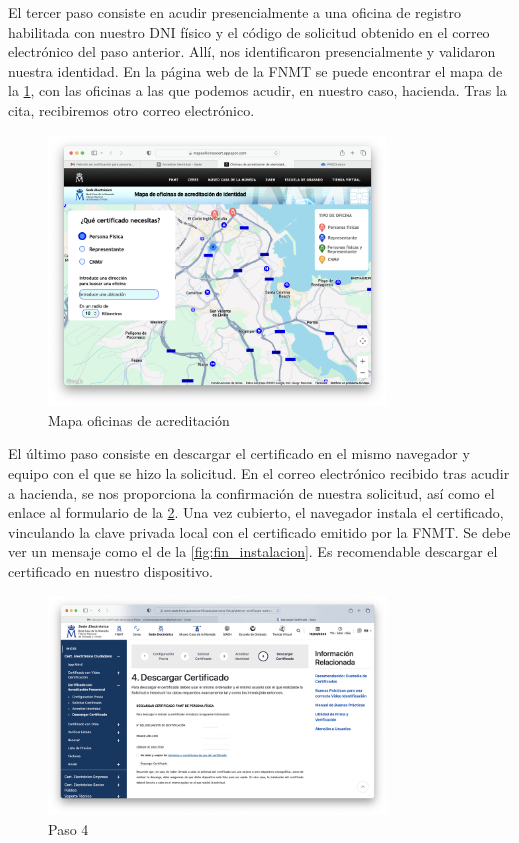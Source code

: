 El tercer paso consiste en acudir presencialmente a una oficina de registro habilitada con nuestro DNI físico y el código de solicitud obtenido en el correo electrónico del paso anterior. Allí, nos identificaron presencialmente y validaron nuestra identidad. En la página web de la FNMT se puede encontrar el mapa de la \ref{fig:mapa}, con las oficinas a las que podemos acudir, en nuestro caso, hacienda. Tras la cita, recibiremos otro correo electrónico. 

\begin{figure}[H]   
    \centering
    \includegraphics[width=0.8\textwidth]{mapa_ej5a.png}
    \caption{Mapa oficinas de acreditación}
    \label{fig:mapa}
\end{figure}

El último paso consiste en descargar el certificado en el mismo navegador y equipo con el que se hizo la solicitud. En el correo electrónico recibido tras acudir a hacienda, se nos proporciona la confirmación de nuestra solicitud, así como el enlace al formulario de la \ref{fig:paso4}. Una vez cubierto, el navegador instala el certificado, vinculando la clave privada local con el certificado emitido por la FNMT. Se debe ver un mensaje como el de la \ref{fig:fin_instalacion}. Es recomendable descargar el certificado en nuestro dispositivo.  

\begin{figure}[H]   
    \centering
    \includegraphics[width=0.8\textwidth]{paso4_ej5a.png}
    \caption{Paso 4}
    \label{fig:paso4}
\end{figure}

